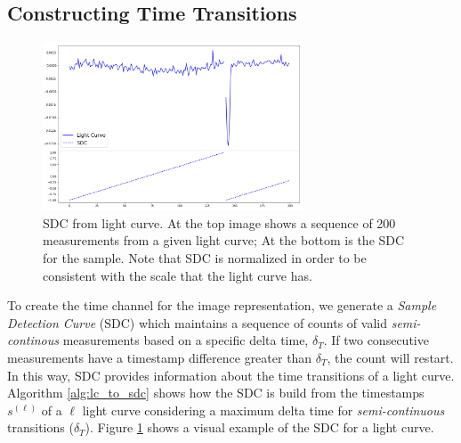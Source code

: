 \subsection{Constructing Time Transitions}
\begin{figure}[t!]
\centering
\includegraphics[width=0.85\linewidth, height=5cm]{imgs/sdc.png}
\caption{SDC from light curve. At the top image shows a sequence of 200 measurements from a given light curve; At the bottom is the SDC for the sample. Note that SDC is normalized in order to be consistent with the scale that the light curve has.}
\label{fig:sdc_example}
\end{figure}
To create the time channel for the image representation, we generate a \textit{Sample Detection Curve} (SDC) which maintains a sequence of counts of valid \textit{semi-continous} measurements based on a specific delta time, $\delta_T$. If two consecutive measurements have a timestamp difference greater than $\delta_T$, the count will restart. In this way, SDC provides information about the time transitions of a light curve. 
Algorithm \ref{alg:lc_to_sdc} shows how the SDC is build from the timestamps $s^{(\ell)}$ of a $\ell$ light curve considering a maximum delta time for \textit{semi-continuous} transitions ($\delta_T$).
Figure \ref{fig:sdc_example} shows a visual example of the SDC for a light curve.


